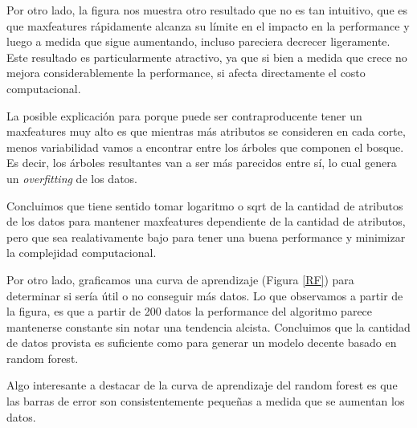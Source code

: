 Por otro lado, la figura nos muestra otro resultado que no es tan intuitivo, que es que maxfeatures rápidamente alcanza su límite en el impacto en la performance y luego a medida que sigue aumentando, incluso pareciera decrecer ligeramente. Este resultado es particularmente atractivo, ya que si bien a medida que crece no mejora considerablemente la performance, si afecta directamente el costo computacional. 

La posible explicación para porque puede ser contraproducente tener un maxfeatures muy alto es que mientras más atributos se consideren en cada corte, menos variabilidad vamos a encontrar entre los árboles que componen el bosque. Es decir, los árboles resultantes van a ser más parecidos entre sí, lo cual genera un \textit{overfitting} de los datos.  

Concluimos que tiene sentido tomar logaritmo o sqrt de la cantidad de atributos de los datos para mantener maxfeatures dependiente de la cantidad de atributos, pero que sea realativamente bajo para tener una buena performance y minimizar la complejidad computacional. 

Por otro lado, graficamos una curva de aprendizaje (Figura \ref{RF}) para determinar si sería útil o no conseguir más datos. Lo que observamos a partir de la figura, es que a partir de 200 datos la performance del algoritmo parece mantenerse constante sin notar una tendencia alcista. Concluimos que la cantidad de datos provista es suficiente como para generar un modelo decente basado en random forest. 

Algo interesante a destacar de la curva de aprendizaje del random forest es que las barras de error son consistentemente pequeñas a medida que se aumentan los datos. 